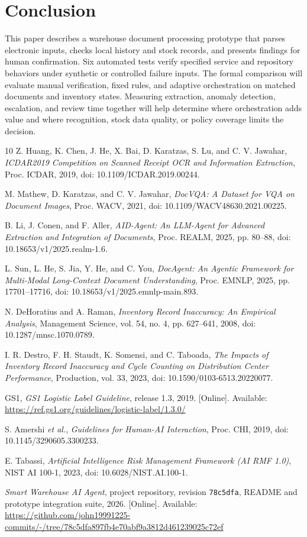 \documentclass[conference]{IEEEtran}
\begin{document}
\section{Conclusion}
This paper describes a warehouse document processing prototype that parses electronic inputs, checks local history and stock records, and presents findings for human confirmation. Six automated tests verify specified service and repository behaviors under synthetic or controlled failure inputs. The formal comparison will evaluate manual verification, fixed rules, and adaptive orchestration on matched documents and inventory states. Measuring extraction, anomaly detection, escalation, and review time together will help determine where orchestration adds value and where recognition, stock data quality, or policy coverage limits the decision.

\begin{thebibliography}{10}
Z. Huang, K. Chen, J. He, X. Bai, D. Karatzas, S. Lu, and C. V. Jawahar, \emph{ICDAR2019 Competition on Scanned Receipt OCR and Information Extraction}, Proc. ICDAR, 2019, doi: 10.1109/ICDAR.2019.00244.

M. Mathew, D. Karatzas, and C. V. Jawahar, \emph{DocVQA: A Dataset for VQA on Document Images}, Proc. WACV, 2021, doi: 10.1109/WACV48630.2021.00225.

B. Li, J. Conen, and F. Aller, \emph{AID-Agent: An LLM-Agent for Advanced Extraction and Integration of Documents}, Proc. REALM, 2025, pp. 80--88, doi: 10.18653/v1/2025.realm-1.6.

L. Sun, L. He, S. Jia, Y. He, and C. You, \emph{DocAgent: An Agentic Framework for Multi-Modal Long-Context Document Understanding}, Proc. EMNLP, 2025, pp. 17701--17716, doi: 10.18653/v1/2025.emnlp-main.893.

N. DeHoratius and A. Raman, \emph{Inventory Record Inaccuracy: An Empirical Analysis}, Management Science, vol. 54, no. 4, pp. 627--641, 2008, doi: 10.1287/mnsc.1070.0789.

I. R. Destro, F. H. Staudt, K. Somensi, and C. Taboada, \emph{The Impacts of Inventory Record Inaccuracy and Cycle Counting on Distribution Center Performance}, Production, vol. 33, 2023, doi: 10.1590/0103-6513.20220077.

GS1, \emph{GS1 Logistic Label Guideline}, release 1.3, 2019. [Online]. Available: \url{https://ref.gs1.org/guidelines/logistic-label/1.3.0/}

S. Amershi \emph{et al.}, \emph{Guidelines for Human-AI Interaction}, Proc. CHI, 2019, doi: 10.1145/3290605.3300233.

E. Tabassi, \emph{Artificial Intelligence Risk Management Framework (AI RMF 1.0)}, NIST AI 100-1, 2023, doi: 10.6028/NIST.AI.100-1.

\emph{Smart Warehouse AI Agent}, project repository, revision \texttt{78c5dfa}, README and prototype integration suite, 2026. [Online]. Available: \url{https://github.com/john19991225-commits/-/tree/78c5dfa897fb4e70abf9a3812d461239025c72ef}
\end{thebibliography}
\end{document}
